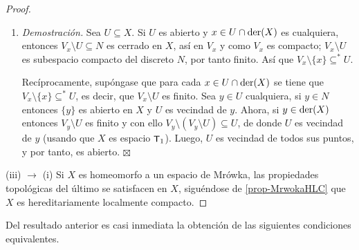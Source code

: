 \begin{proof}
\begin{enumerate}[\hspace{1.5 cm}, listparindent=1.5em]
		\item \textit{Demostración.} Sea $U \subseteq X$. Si $U$ es abierto y $x \in U \cap \operatorname{der}(X)$ es cualquiera, entonces $V_x \setminus U \subseteq N$ es cerrado en $X$, así en $V_x$ y como $V_x$ es compacto; $V_x \setminus U$ es subespacio compacto del discreto $N$, por tanto finito. Así que $V_x \setminus \{x\} \subseteq^* U$.
		
		Recíprocamente, supóngase que para cada $x \in U \cap \operatorname{der}(X)$ se tiene que $V_x \setminus \{x\} \subseteq^* U$, es decir, que $V_x \setminus U$ es finito. Sea $y \in U$ cualquiera, si $y \in N$ entonces $\{y\}$ es abierto en $X$ y $U$ es vecindad de $y$. Ahora, si $y \in \operatorname{der}(X)$ entonces $V_y \setminus U$ es finito y con ello $V_y \setminus (V_y \setminus U) \subseteq U$, de donde $U$ es vecindad de $y$ (usando que $X$ es espacio $\text{\textsf{\small T}}_1$). Luego, $U$ es vecindad de todos sus puntos, y por tanto, es abierto. \hfill$\boxtimes$
	\end{enumerate}
	
	(iii) $\rightarrow$ (i) Si $X$ es homeomorfo a un espacio de Mrówka, las propiedades topológicas del último se satisfacen en $X$, siguéndose de \ref{prop-MrwokaHLC} que $X$ es hereditariamente localmente compacto.
	\end{proof}
	
	Del resultado anterior es casi inmediata la obtención de las siguientes condiciones equivalentes.
	
